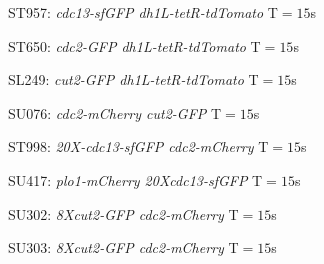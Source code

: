 \framebreak
\begin{figure}
\centering
   \def\svgwidth{0.75\columnwidth}

\caption{ST957: {\it cdc13-sfGFP dh1L-tetR-tdTomato} T$=15$s}
\end{figure}

\framebreak

\begin{figure}
\centering
   \def\svgwidth{0.75\columnwidth}

\caption{ST650: {\it cdc2-GFP dh1L-tetR-tdTomato} T$=15$s}
\end{figure}

\framebreak
\begin{figure}

\centering
   \def\svgwidth{0.75\columnwidth}

\caption{SL249: {\it cut2-GFP dh1L-tetR-tdTomato} T$=15$s}
\end{figure}

\framebreak
\begin{figure}
\centering
   \def\svgwidth{0.75\columnwidth}

\caption{SU076: {\it cdc2-mCherry cut2-GFP} T$=15$s}
\end{figure}




\framebreak

\begin{figure}
\centering
   \def\svgwidth{0.75\columnwidth}

\caption{ {ST998: {\it 20X-cdc13-sfGFP cdc2-mCherry} T$=15$s}}
\end{figure}

\framebreak
\begin{figure}
\centering
   \def\svgwidth{0.75\columnwidth}

\caption{SU417: {\it plo1-mCherry 20Xcdc13-sfGFP} T$=15$s}
\end{figure}

\framebreak
\begin{figure}
\centering
   \def\svgwidth{0.75\columnwidth}

\caption {SU302: {\it 8Xcut2-GFP cdc2-mCherry} T$=15$s}
\end{figure}

\framebreak
\begin{figure}
\centering
   \def\svgwidth{0.75\columnwidth}

\caption{SU303: {\it 8Xcut2-GFP cdc2-mCherry } T$=15$s}
\end{figure}

